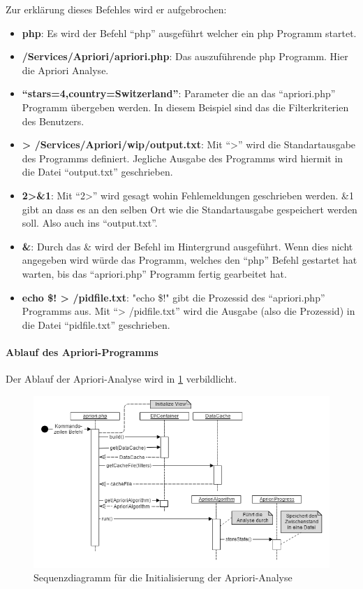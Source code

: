 Zur erklärung dieses Befehles wird er aufgebrochen:
\begin{itemize}
	\item \textbf{php}: Es wird der Befehl "`php"' ausgeführt welcher ein \gls{php} Programm startet.
	\item \textbf{/Services/Apriori/apriori.php}: Das auszuführende \gls{php} Programm. Hier die Apriori Analyse.
	\item \textbf{``stars=4,country=Switzerland''}: Parameter die an das "`apriori.php"' Programm übergeben werden. In diesem Beispiel sind das die Filterkriterien des Benutzers.
	\item \textbf{> /Services/Apriori/wip/output.txt}: Mit "`>"' wird die Standartausgabe des Programms definiert. Jegliche Ausgabe des Programms wird hiermit in die Datei "`output.txt"' geschrieben.
	\item \textbf{2>\&1}: Mit "`2>"' wird gesagt wohin Fehlemeldungen geschrieben werden. \&1 gibt an dass es an den selben Ort wie die Standartausgabe gespeichert werden soll. Also auch ins "`output.txt"'.
	\item \textbf{\&}: Durch das \& wird der Befehl im Hintergrund ausgeführt. Wenn dies nicht angegeben wird würde das Programm, welches den "`php"' Befehl gestartet hat warten, bis das "`apriori.php"' Programm fertig gearbeitet hat.
	\item \textbf{echo \$! > /pidfile.txt}: "echo \$!" gibt die Prozessid des "`apriori.php"' Programms aus. Mit "`> /pidfile.txt"' wird die Ausgabe (also die Prozessid) in die Datei "`pidfile.txt"' geschrieben.
\end{itemize}

\paragraph{Ablauf des Apriori-Programms}
Der Ablauf der Apriori-Analyse wird in \cref{fig:proofofconcept:architektur:hintergrundprozesser:1} verbildlicht.

\begin{figure}[H]
	\centering
	\includegraphics[width=1\textwidth]{images/diagram-sequence-apriori}
	\caption{Sequenzdiagramm für die Initialisierung der Apriori-Analyse}
	\label{fig:proofofconcept:architektur:hintergrundprozesser:1}
\end{figure}

